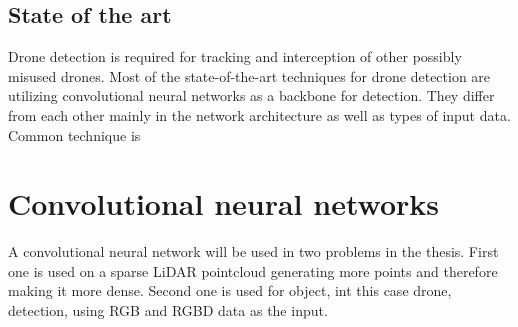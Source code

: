 \documentclass[twoside]{ctuthesis}
\theoremstyle{plain}
\theoremstyle{definition}
\theoremstyle{note}
\begin{document}
\section{State of the art}
Drone detection is required for tracking and interception of other possibly misused drones. Most of the state-of-the-art techniques for drone detection are utilizing convolutional neural networks as a backbone for detection. They differ from each other mainly in the network architecture as well as types of input data. \newline
\newline
Common technique is 
\chapter{Convolutional neural networks}
A convolutional neural network will be used in two problems in the thesis. First one is used on a sparse LiDAR pointcloud generating more points and therefore making it more dense. Second one is used for object, int this case drone, detection, using RGB and RGBD data as the input.
\end{document}
